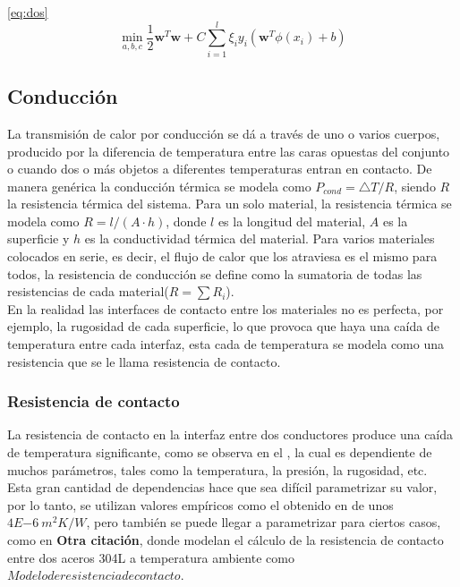 \ref{eq:dos}
\begin{subequations}
\label{eq: uno}
\begin{equation}
\label{eq:dos}
  \operatorname{min}_{a,b,c} 
  \frac{1}{2}\mathbf{w}^{T}\mathbf{w} + C \sum_{i=1}^{l}\xi_{i} 
\end{equation}    
\begin{equation}
  y_{i}\left(\mathbf{w}^{T}\phi(x_{i})+b\right)
\end{equation}
\end{subequations}
\subsection{Conducción}
La transmisión de calor por conducción se dá a través de uno o varios cuerpos, producido por la diferencia de temperatura entre las caras opuestas del conjunto o cuando dos o más objetos a diferentes temperaturas entran en contacto. De manera genérica la conducción térmica se modela como $P_{cond}={\bigtriangleup T}/{R} $, siendo $R$ la resistencia térmica del sistema.
Para un solo material, la resistencia térmica se modela como $R = l/{\left(A\cdot h\right)}$, donde $l$ es la longitud del material, $A$ es la superficie y $h$ es la conductividad térmica del material. Para varios materiales colocados en serie, es decir, el flujo de calor que los atraviesa es el mismo para todos, la resistencia de conducción se define como la sumatoria de todas las resistencias de cada material($R=\sum R_i$).\\

En la realidad las interfaces de contacto entre los materiales no es perfecta, por ejemplo, la rugosidad de cada superficie, lo que provoca que haya una caída de temperatura entre cada interfaz, esta cada de temperatura se modela como una resistencia que se le llama resistencia de contacto.


\subsubsection{Resistencia de contacto}
La resistencia de contacto en la interfaz entre dos conductores produce una caída de temperatura significante, como se observa en el \cite{nf_TPV_Pillars_SiO2}, la cual es dependiente de muchos parámetros, tales como la temperatura, la presión, la rugosidad, etc.\\

Esta gran cantidad de dependencias hace que sea difícil parametrizar su valor, por lo tanto, se utilizan valores empíricos como el obtenido en \cite{nf_TPV_Pillars_SiO2} de unos $4E{-6} \ m^2K/W$, pero también se puede llegar a parametrizar para ciertos casos, como en \textbf{Otra citación}, donde modelan el cálculo de la resistencia de contacto entre dos aceros 304L a temperatura ambiente como $Modelo de resistencia de contacto$.